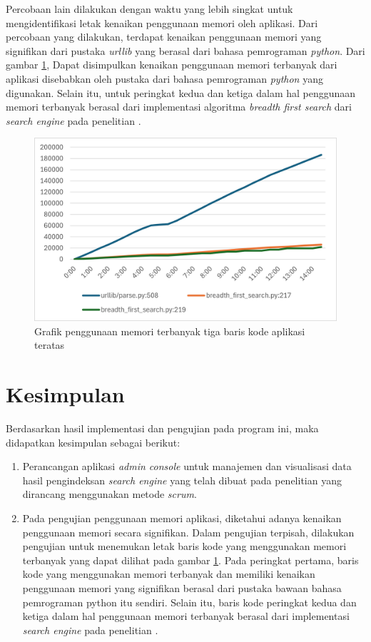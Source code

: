\documentclass[
	a4paper, %
	10pt, %
	unnumberedsections, %
	twoside, %
]{LTJournalArticle}
\begin{document}
Percobaan lain dilakukan dengan waktu yang lebih singkat untuk mengidentifikasi letak kenaikan penggunaan memori oleh aplikasi. Dari percobaan yang dilakukan, terdapat kenaikan penggunaan memori yang signifikan dari pustaka \textit{urllib} yang berasal dari bahasa pemrograman \textit{python}. Dari gambar \ref{gambar:linemem}, Dapat disimpulkan kenaikan penggunaan memori terbanyak dari aplikasi disebabkan oleh pustaka dari bahasa pemrograman \textit{python} yang digunakan. Selain itu, untuk peringkat kedua dan ketiga dalam hal penggunaan memori terbanyak berasal dari implementasi algoritma \textit{breadth first search} dari \textit{search engine} pada penelitian \cite{lazu}.

\begin{figure}[H]
	\includegraphics[width=\linewidth]{line_memusage_chart.png}
	\caption{Grafik penggunaan memori terbanyak tiga baris kode aplikasi teratas}
	\label{gambar:linemem}
\end{figure}

\section{Kesimpulan}
Berdasarkan  hasil  implementasi  dan  pengujian  pada program ini, maka didapatkan kesimpulan sebagai berikut:
\begin{enumerate}
	\item Perancangan aplikasi \textit{admin console} untuk manajemen dan visualisasi data hasil pengindeksan \textit{search engine} yang telah dibuat pada penelitian \cite{lazu} yang dirancang menggunakan metode \textit{scrum}.
	\item Pada pengujian penggunaan memori aplikasi, diketahui adanya kenaikan penggunaan memori secara signifikan. Dalam pengujian terpisah, dilakukan pengujian untuk menemukan letak baris kode yang menggunakan memori terbanyak yang dapat dilihat pada gambar \ref{gambar:linemem}. Pada peringkat pertama, baris kode yang menggunakan memori terbanyak dan memiliki kenaikan penggunaan memori yang signifikan berasal dari pustaka bawaan bahasa pemrograman python itu sendiri. Selain itu, baris kode peringkat kedua dan ketiga dalam hal penggunaan memori terbanyak berasal dari implementasi \textit{search engine} pada penelitian \cite{lazu}. 
\end{enumerate}
\end{document}
